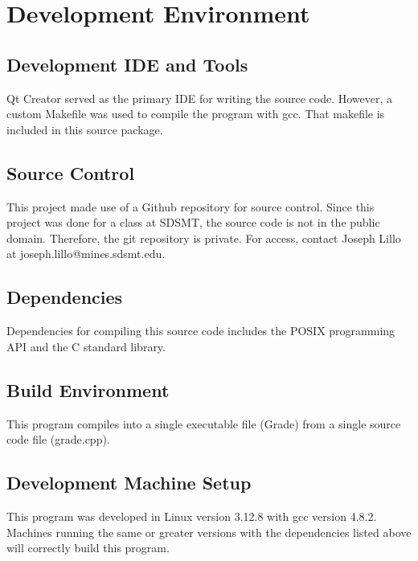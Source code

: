 \chapter{Development Environment}

\section{Development IDE and Tools}
Qt Creator served as the primary IDE for writing the source code. However, a custom Makefile was used to compile the program with gcc. That makefile is included in this source package.

\section{Source  Control}
This project made use of a Github repository for source control. Since this project was done for a class at SDSMT, the source code is not in the public domain. Therefore, the git repository is private. For access, contact Joseph Lillo at joseph.lillo@mines.sdsmt.edu.

\section{Dependencies}
Dependencies for compiling this source code includes the POSIX programming API and the C standard library.


\section{Build  Environment}
This program compiles into a single executable file (Grade) from a single source code file (grade.cpp). 

\section{Development Machine Setup}
This program was developed in Linux version 3.12.8 with gcc version 4.8.2.
\\Machines running the same or greater versions with the dependencies listed above will correctly build this program. 

